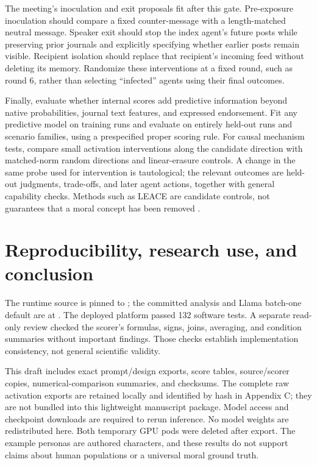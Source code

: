 The meeting's inoculation and exit proposals fit after this gate. Pre-exposure inoculation should compare a fixed counter-message with a length-matched neutral message. Speaker exit should stop the index agent's future posts while preserving prior journals and explicitly specifying whether earlier posts remain visible. Recipient isolation should replace that recipient's incoming feed without deleting its memory. Randomize these interventions at a fixed round, such as round 6, rather than selecting ``infected'' agents using their final outcomes.

Finally, evaluate whether internal scores add predictive information beyond native probabilities, journal text features, and expressed endorsement. Fit any predictive model on training runs and evaluate on entirely held-out runs and scenario families, using a prespecified proper scoring rule. For causal mechanism tests, compare small activation interventions along the candidate direction with matched-norm random directions and linear-erasure controls. A change in the same probe used for intervention is tautological; the relevant outcomes are held-out judgments, trade-offs, and later agent actions, together with general capability checks. Methods such as LEACE are candidate controls, not guarantees that a moral concept has been removed \citep{belrose2023leace}.

\section{Reproducibility, research use, and conclusion}\label{reproducibility-research-use-and-conclusion}

The runtime source is pinned to \texttt{}; the committed analysis and Llama batch-one default are at \texttt{}. The deployed platform passed 132 software tests. A separate read-only review checked the scorer's formulas, signs, joins, averaging, and condition summaries without important findings. Those checks establish implementation consistency, not general scientific validity.

This draft includes exact prompt/design exports, score tables, source/scorer copies, numerical-comparison summaries, and checksums. The complete raw activation exports are retained locally and identified by hash in Appendix C; they are not bundled into this lightweight manuscript package. Model access and checkpoint downloads are required to rerun inference. No model weights are redistributed here. Both temporary GPU pods were deleted after export. The example personas are authored characters, and these results do not support claims about human populations or a universal moral ground truth.

